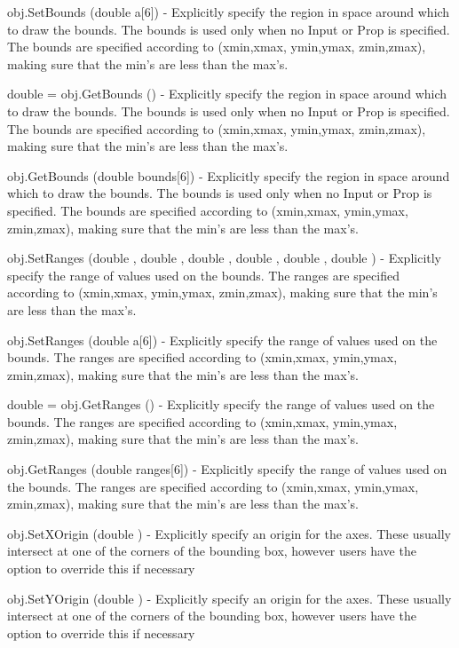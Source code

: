 \begin{DoxyItemize}
\item {\ttfamily obj.\-Set\-Bounds (double a\mbox{[}6\mbox{]})} -\/ Explicitly specify the region in space around which to draw the bounds. The bounds is used only when no Input or Prop is specified. The bounds are specified according to (xmin,xmax, ymin,ymax, zmin,zmax), making sure that the min's are less than the max's.  
\item {\ttfamily double = obj.\-Get\-Bounds ()} -\/ Explicitly specify the region in space around which to draw the bounds. The bounds is used only when no Input or Prop is specified. The bounds are specified according to (xmin,xmax, ymin,ymax, zmin,zmax), making sure that the min's are less than the max's.  
\item {\ttfamily obj.\-Get\-Bounds (double bounds\mbox{[}6\mbox{]})} -\/ Explicitly specify the region in space around which to draw the bounds. The bounds is used only when no Input or Prop is specified. The bounds are specified according to (xmin,xmax, ymin,ymax, zmin,zmax), making sure that the min's are less than the max's.  
\item {\ttfamily obj.\-Set\-Ranges (double , double , double , double , double , double )} -\/ Explicitly specify the range of values used on the bounds. The ranges are specified according to (xmin,xmax, ymin,ymax, zmin,zmax), making sure that the min's are less than the max's.  
\item {\ttfamily obj.\-Set\-Ranges (double a\mbox{[}6\mbox{]})} -\/ Explicitly specify the range of values used on the bounds. The ranges are specified according to (xmin,xmax, ymin,ymax, zmin,zmax), making sure that the min's are less than the max's.  
\item {\ttfamily double = obj.\-Get\-Ranges ()} -\/ Explicitly specify the range of values used on the bounds. The ranges are specified according to (xmin,xmax, ymin,ymax, zmin,zmax), making sure that the min's are less than the max's.  
\item {\ttfamily obj.\-Get\-Ranges (double ranges\mbox{[}6\mbox{]})} -\/ Explicitly specify the range of values used on the bounds. The ranges are specified according to (xmin,xmax, ymin,ymax, zmin,zmax), making sure that the min's are less than the max's.  
\item {\ttfamily obj.\-Set\-X\-Origin (double )} -\/ Explicitly specify an origin for the axes. These usually intersect at one of the corners of the bounding box, however users have the option to override this if necessary  
\item {\ttfamily obj.\-Set\-Y\-Origin (double )} -\/ Explicitly specify an origin for the axes. These usually intersect at one of the corners of the bounding box, however users have the option to override this if necessary  

\end{DoxyItemize}
